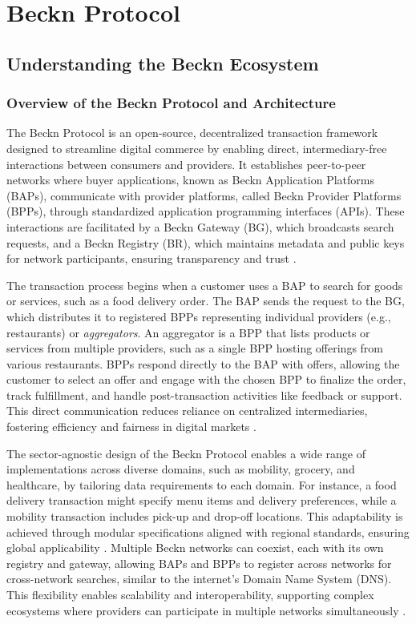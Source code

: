 \newpage
\section{Beckn Protocol}
\label{beckn_protocol}
\subsection{Understanding the Beckn Ecosystem}
\subsubsection{Overview of the Beckn Protocol and Architecture}
\label{overview_beckn}
The Beckn Protocol is an open-source, decentralized transaction framework designed to streamline digital commerce by enabling direct, intermediary-free interactions between consumers and providers. It establishes peer-to-peer networks where buyer applications, known as Beckn Application Platforms (BAPs), communicate with provider platforms, called Beckn Provider Platforms (BPPs), through standardized application programming interfaces (APIs). These interactions are facilitated by a Beckn Gateway (BG), which broadcasts search requests, and a Beckn Registry (BR), which maintains metadata and public keys for network participants, ensuring transparency and trust \citep{beckn_video_overview}.

The transaction process begins when a customer uses a BAP to search for goods or services, such as a food delivery order. The BAP sends the request to the BG, which distributes it to registered BPPs representing individual providers (e.g., restaurants) or \textit{aggregators}. An aggregator is a BPP that lists products or services from multiple providers, such as a single BPP hosting offerings from various restaurants. BPPs respond directly to the BAP with offers, allowing the customer to select an offer and engage with the chosen BPP to finalize the order, track fulfillment, and handle post-transaction activities like feedback or support. This direct communication reduces reliance on centralized intermediaries, fostering efficiency and fairness in digital markets \citep{beckn_video_overview}.

The sector-agnostic design of the Beckn Protocol enables a wide range of implementations across diverse domains, such as mobility, grocery, and healthcare, by tailoring data requirements to each domain. For instance, a food delivery transaction might specify menu items and delivery preferences, while a mobility transaction includes pick-up and drop-off locations. This adaptability is achieved through modular specifications aligned with regional standards, ensuring global applicability \citep{beckn_video_overview}. Multiple Beckn networks can coexist, each with its own registry and gateway, allowing BAPs and BPPs to register across networks for cross-network searches, similar to the internet’s Domain Name System (DNS). This flexibility enables scalability and interoperability, supporting complex ecosystems where providers can participate in multiple networks simultaneously \citep{beckn_video_overview}.

